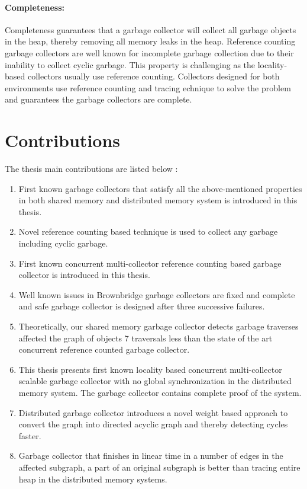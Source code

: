 \paragraph{Completeness:}
Completeness guarantees that a garbage collector will collect all garbage objects in the heap, thereby removing all memory leaks in the heap. Reference counting garbage collectors are well known for incomplete garbage collection due to their inability to collect cyclic garbage. This property is challenging as the locality-based collectors usually use reference counting. Collectors designed for both environments use reference counting and tracing echnique to solve the problem and guarantees the garbage collectors are complete.
\section{Contributions}
\label{intro:contr}
The thesis main contributions are listed below :
\begin{enumerate}
	\item First known garbage collectors that satisfy all the above-mentioned properties in both shared memory and distributed memory system is introduced in this thesis.
	\item Novel reference counting based technique is used to collect any garbage including cyclic garbage.    
	\item First known concurrent multi-collector reference counting based garbage collector is introduced in this thesis.
	\item Well known issues in Brownbridge garbage collectors are fixed and complete and safe garbage collector is designed after three successive failures.
	\item Theoretically, our shared memory garbage collector detects garbage traverses affected the graph of objects 7 traversals less than the state of the art concurrent reference counted garbage collector.
	\item This thesis presents first known locality based concurrent multi-collector scalable garbage collector with no global synchronization in the distributed memory system. The garbage collector contains complete proof of the system.
	\item Distributed garbage collector introduces a novel weight based approach to convert the graph into directed acyclic graph and thereby detecting cycles faster.
	\item Garbage collector that finishes in linear time in a number of edges in the affected subgraph, a part of an original subgraph is better than tracing entire heap in the distributed memory systems.
\end{enumerate}
